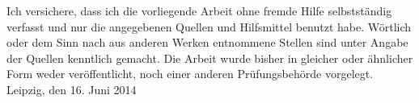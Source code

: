 \normalsize{Ich versichere, dass ich die vorliegende Arbeit ohne fremde Hilfe selbstständig verfasst und nur die angegebenen Quellen und Hilfsmittel benutzt habe. Wörtlich 
oder dem Sinn nach aus anderen
Werken entnommene Stellen sind unter Angabe der Quellen kenntlich gemacht. Die Arbeit wurde bisher in gleicher oder ähnlicher Form weder 
veröffentlicht, noch 
einer anderen Prüfungsbehörde vorgelegt.
\newline
\newline
\newline
\newline
Leipzig, den 16. Juni 2014}